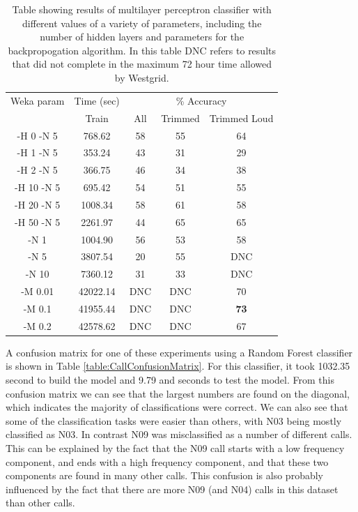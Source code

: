 \documentclass[12pt,oneside]{book}
\begin{document}
\begin{table}
\begin{tabular}{|c|c|c|c|c|}
\hline
\multicolumn{1}{|c|}{Weka param} & \multicolumn{1}{c|}{Time (sec)} & \multicolumn{3}{c|}{\% Accuracy} \\
\hhline{|-|-|-|-|-|}
 & Train & All & Trimmed & Trimmed Loud \\
\hhline{|=|=|=|=|=|}
 -H 0 -N 5      &   768.62  &    58  & 55  & 64  \\
 -H 1 -N 5      &   353.24  &    43  & 31  & 29  \\
 -H 2 -N 5      &   366.75  &    46  & 34  & 38  \\
 -H 10 -N 5     &   695.42  &    54  & 51  & 55  \\
 -H 20 -N 5     &  1008.34  &    58  & 61  & 58  \\
 -H 50 -N 5     &  2261.97  &    44  & 65  & 65  \\
 -N 1           &  1004.90  &    56  & 53  & 58  \\
 -N 5           &  3807.54  &    20  & 55  & DNC \\
 -N 10          &  7360.12  &    31  & 33  & DNC \\
 -M 0.01        &  42022.14 &    DNC & DNC & 70  \\
 -M 0.1         &  41955.44 &    DNC & DNC & \textbf{73}  \\
 -M 0.2         &  42578.62 &    DNC & DNC & 67  \\
\hline
\end{tabular}
\caption{Table showing results of multilayer perceptron classifier
  with different values of a variety of parameters, including the
  number of hidden layers and parameters for the backpropogation
  algorithm.  In this table DNC refers to results that did not
  complete in the maximum 72 hour time allowed by Westgrid.}
\label{table:calls-weka-multilayerPerceptron}
\end{table}

A confusion matrix for one of these experiments using a Random Forest
classifier is shown in Table \ref{table:CallConfusionMatrix}.  For
this classifier, it took 1032.35 second to build the model and 9.79
and seconds to test the model.  From this confusion matrix we can see
that the largest numbers are found on the diagonal, which indicates
the majority of classifications were correct.  We can also see that
some of the classification tasks were easier than others, with N03
being mostly classified as N03. In contrast N09 was misclassified as a
number of different calls.  This can be explained by the fact that the
N09 call starts with a low frequency component, and ends with a high
frequency component, and that these two components are found in many
other calls.  This confusion is also probably influenced by the fact
that there are more N09 (and N04) calls in this dataset than other
calls.
\end{document}
